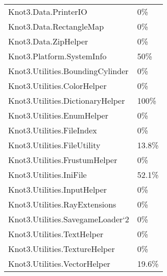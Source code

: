 \documentclass[a4paper,10pt]{article}
\begin{document}
\begin{longtable}[l]{ll}
Knot3.Data.PrinterIO & 0\%\\
Knot3.Data.RectangleMap & 0\%\\
Knot3.Data.ZipHelper & 0\%\\
Knot3.Platform.SystemInfo & 50\%\\
Knot3.Utilities.BoundingCylinder & 0\%\\
Knot3.Utilities.ColorHelper & 0\%\\
Knot3.Utilities.DictionaryHelper & 100\%\\
Knot3.Utilities.EnumHelper & 0\%\\
Knot3.Utilities.FileIndex & 0\%\\
Knot3.Utilities.FileUtility & 13.8\%\\
Knot3.Utilities.FrustumHelper & 0\%\\
Knot3.Utilities.IniFile & 52.1\%\\
Knot3.Utilities.InputHelper & 0\%\\
Knot3.Utilities.RayExtensions & 0\%\\
Knot3.Utilities.SavegameLoader`2 & 0\%\\
Knot3.Utilities.TextHelper & 0\%\\
Knot3.Utilities.TextureHelper & 0\%\\
Knot3.Utilities.VectorHelper & 19.6\%\\
\end{longtable}
\end{document}
